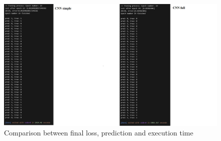 \documentclass{article}
\begin{document}
\clearpage %

\begin{figure}[!ht]
    \centering
    \includegraphics[width=\linewidth]{Comparison_between_final-loss_prediction_execution-time.png}
    \caption{Comparison between final loss, prediction and execution time}
    \label{fig:comparison_other_parameters}
\end{figure}
\end{document}
